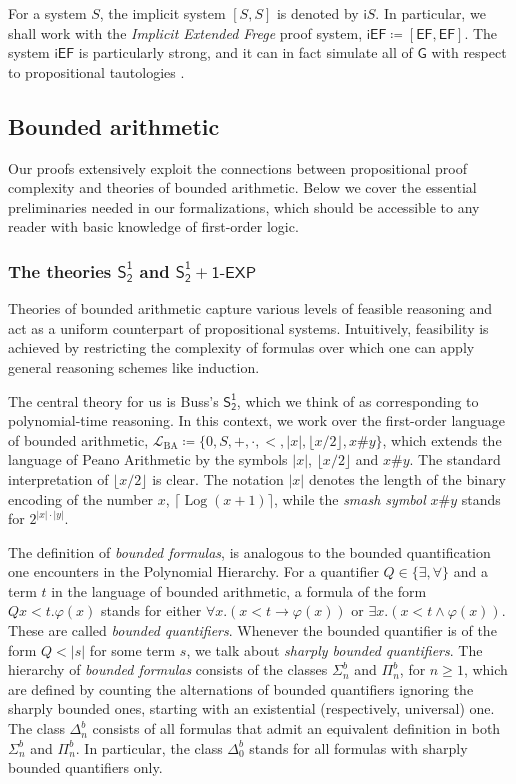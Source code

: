\documentclass[11pt]{article}
\newcommand{\SOT}{\mathsf{S^1_2}}
\newcommand{\SOTEXP}{\mathsf{S^1_2} + \mathsf{1\textsf{-}EXP}}
\newcommand{\EF}{\mathsf{EF}}
\newcommand{\iEF}{\mathsf{iEF}}
\newcommand{\imp}{\mathsf{i}}
\theoremstyle{definition}
\theoremstyle{plain}
\theoremstyle{remark}
\newcommand{\Log}{\operatorname{Log}}
\providecommand{\log}{\Log}
\begin{document}
For a system $S$, the implicit system $[S, S]$ is denoted by $\imp S$. In particular, we shall work with the \emph{Implicit Extended Frege} proof system, $\iEF \coloneqq [\EF, \EF]$. The system $\iEF$ is particularly strong, and it can in fact simulate all of $\mathsf{G}$ with respect to propositional tautologies \cite[Cor. 2.4]{Kra04}.

\subsection{Bounded arithmetic}

Our proofs extensively exploit the connections between propositional proof complexity and theories of bounded arithmetic. Below we cover the essential preliminaries needed in our formalizations, which should be accessible to any reader with basic knowledge of first-order logic. 

\subsubsection{The theories $\SOT$ and $\SOTEXP$}
Theories of bounded arithmetic capture various levels of feasible reasoning and act as a uniform counterpart of propositional systems. Intuitively, feasibility is achieved by restricting the complexity of formulas over which one can apply general reasoning schemes like induction.

The central theory for us is Buss's $\SOT$, which we think of as corresponding to polynomial-time reasoning. In this context, we work over the first-order language of bounded arithmetic, $\mathcal{L}_{\text{BA}} \coloneqq \{ 0, S, +, \cdot, <, |x|, \lfloor x/2 \rfloor, x \# y\}$, which extends the language of Peano Arithmetic by the symbols $|x|$, $\lfloor x/2 \rfloor$ and $x \# y$. The standard interpretation of $\lfloor x/2 \rfloor$ is clear. The notation $|x|$ denotes the length of the binary encoding of the number $x$, $\lceil \log (x + 1) \rceil$, while the \emph{smash symbol} $x\#y$ stands for $2^{|x|\cdot|y|}$.

The definition of \emph{bounded formulas}, is analogous to the bounded quantification one encounters in the Polynomial Hierarchy. For a quantifier $Q \in \{ \exists, \forall\}$ and a term $t$ in the language of bounded arithmetic, a formula of the form $Qx< t. \varphi(x)$ stands for either $\forall x. (x < t \to \varphi(x))$ or $\exists x. (x < t \land \varphi(x))$. These are called \emph{bounded quantifiers}. Whenever the bounded quantifier is of the form $Q < |s|$ for some term $s$, we talk about \emph{sharply bounded quantifiers}. The hierarchy of \emph{bounded formulas} consists of the classes $\Sigma_n^b$ and $\Pi_n^b$, for $n \geq 1$, which are defined by counting the alternations of bounded quantifiers ignoring the sharply bounded ones, starting with an existential (respectively, universal) one. The class $\Delta_n^b$ consists of all formulas that admit an equivalent definition in both $\Sigma_n^b$ and $\Pi_n^b$. In particular, the class $\Delta_0^b$ stands for all formulas with sharply bounded quantifiers only.
\end{document}
